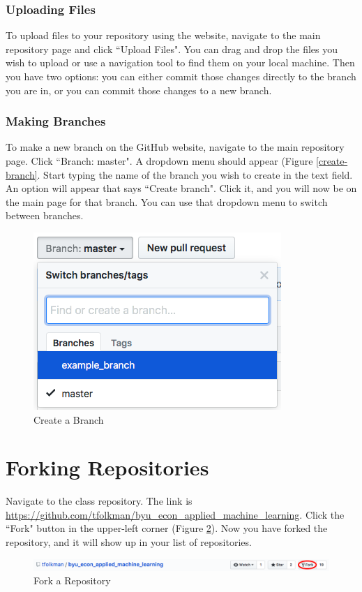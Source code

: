 \documentclass[11pt,a4paper]{article}
\begin{document}
\subsubsection*{Uploading Files}
To upload files to your repository using the website, navigate to the main repository page and click ``Upload Files".
You can drag and drop the files you wish to upload or use a navigation tool to find them on your local machine.
Then you have two options: you can either commit those changes directly to the branch you are in, or you can commit those changes to a new branch.

\subsubsection*{Making Branches}
To make a new branch on the GitHub website, navigate to the main repository page.
Click ``Branch: master".
A dropdown menu should appear (Figure \ref{create-branch}.
Start typing the name of the branch you wish to create in the text field.
An option will appear that says ``Create branch".
Click it, and you will now be on the main page for that branch.
You can use that dropdown menu to switch between branches.

\begin{figure}[h!]
\centering
\includegraphics[width=.4\textwidth]{figures/create_branch_website.png}
\caption{Create a Branch}
\label{fig:create-branch}
\end{figure}

\section*{Forking Repositories}
Navigate to the class repository. 
The link is \url{https://github.com/tfolkman/byu_econ_applied_machine_learning}.
Click the ``Fork" button in the upper-left corner (Figure \ref{fig:fork}).
Now you have forked the repository, and it will show up in your list of repositories.

\begin{figure}[h!]
\centering
\includegraphics[width=.7\textwidth]{figures/fork.png}
\caption{Fork a Repository}
\label{fig:fork}
\end{figure}
\end{document}
